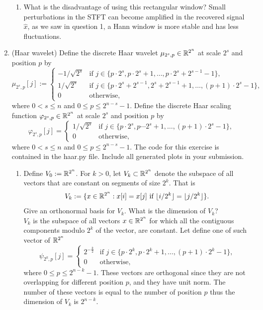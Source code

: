 \documentclass[12pt,twoside]{article}
\begin{document}
\begin{enumerate}
\begin{enumerate}
  \item What is the disadvantage of using this rectangular window?
Small perturbations in the STFT can become amplified in the recovered signal $\hat{x}$, as we saw in question 1, a Hann window is more stable and has less fluctuations.

  \end{enumerate}
 
  \newpage
 \item (Haar wavelet) Define the discrete Haar wavelet $\mu_{2^s,p}\in\mathbb{R}^{2^n}$ at scale
  $2^s$ and position $p$ by
  $$\mu_{2^s,p}[j] :=
  \begin{cases}
    -1/\sqrt{2^{s}} & \text{if $j\in\{p\cdot 2^s,p\cdot 2^s+1,\ldots,p\cdot 2^s+2^{s-1}-1\}$,}\\
    1/\sqrt{2^{s}} & \text{if $j\in\{p\cdot 2^s+2^{s-1},2^s+2^{s-1}+1,\ldots,(p+1)\cdot2^{s}-1\}$,}\\
    0 & \text{otherwise,}
  \end{cases}
  $$
  where $0<s\leq n$ and $0 \leq p \leq 2^{n-s}-1$.  Define the
  discrete Haar scaling function $\varphi_{2^s,p}\in\mathbb{R}^{2^n}$ at scale $2^s$ and position $p$  by
  $$\varphi_{2^s,p}[j]=
  \begin{cases}
    1/\sqrt{2^{s}} & \text{if $j\in\{p\cdot 2^s,p\cdots 2^s+1,\ldots,(p+1)\cdot 2^{s}-1\}$,}\\
    0 & \text{otherwise,}
  \end{cases}$$
  where $0<s\leq n$ and $0\leq p\leq 2^{n-s}-1$.
  The code for this
  exercise is contained in the haar.py file. Include all generated plots in your submission.
  \begin{enumerate}
  \item Define $V_0:=\mathbb{R}^{2^n}$.  For $k>0$, let $V_k\subset\mathbb{R}^{2^n}$ denote the subspace
    of all vectors that are constant on segments of size $2^k$.  That
    is
    $$V_k := \{x\in\mathbb{R}^{2^n}: \text{$x[i] = x[j]$ if $\lfloor
      i/2^k\rfloor = \lfloor j/2^k\rfloor$}\}.$$
    Give an orthonormal basis for $V_k$.  What is the dimension of
    $V_k$? \\
    $V_k$ is the subspace of all vectors $x\in\mathbb{R}^{2^n}$ for which all the contiguous components modulo $2^k$ of the vector, are constant.
    Let define one of such vector of $\mathbb{R}^{2^n}$ 
  \begin{equation*}
  \psi_{2^{k},p}[j] =
  \begin{cases}
    2^{-\frac{k}{2}} & \text{if $j\in\{p\cdot 2^k,p\cdot 2^k+1,\ldots,(p+1)\cdot2^{k}-1\}$,}\\
    0 & \text{otherwise,}
    \end{cases}       
\end{equation*}
 where $0 \leq p \leq 2^{n-k}-1$.
 These vectors are orthogonal since they are not overlapping for different position $p$, and they have unit norm.
 The number of these vectors is equal to the number of position $p$ thus the dimension of  $V_k$ is $2^{n-k}$.
 

\end{enumerate}
\end{enumerate}
\end{document}

